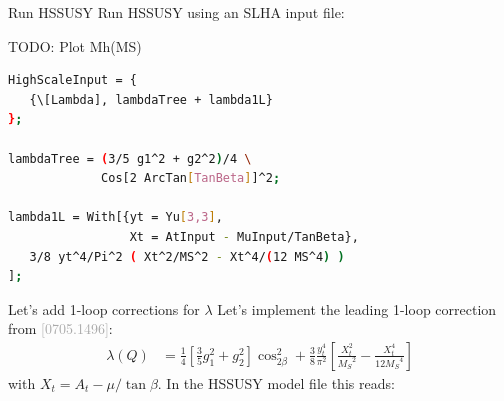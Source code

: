 \documentclass[hyperref={pdfpagelabels=false},ngerman]{beamer}
\newcommand{\MS}{\ensuremath{M_S}}
\newcommand{\bigcite}[1]{\textcolor{darkgray}{[#1]}}
\begin{document}
\begin{frame}{Run HSSUSY}
  Run HSSUSY using an SLHA input file:\\[2em]
  \usebox{\listbox}
\end{frame}

\begin{frame}
  TODO: Plot Mh(MS)
\end{frame}

\begin{lrbox}{\listbox}\begin{lstlisting}[language=bash]
HighScaleInput = {
   {\[Lambda], lambdaTree + lambda1L}
};

lambdaTree = (3/5 g1^2 + g2^2)/4 \
             Cos[2 ArcTan[TanBeta]]^2;

lambda1L = With[{yt = Yu[3,3],
                 Xt = AtInput - MuInput/TanBeta},
   3/8 yt^4/Pi^2 ( Xt^2/MS^2 - Xt^4/(12 MS^4) )
];
\end{lstlisting}\end{lrbox} %

\begin{frame}{Let's add 1-loop corrections for $\lambda$}
  Let's implement the leading 1-loop correction from
  \bigcite{0705.1496}:
  \begin{align*}
    \lambda(Q) &= \frac{1}{4} \left[ \frac{3}{5} g_1^2 + g_2^2 \right] \cos_{2\beta}^2 
    + \frac{3}{8} \frac{y_t^4}{\pi^2}\left[
       \frac{X_t^2}{\MS^2}
       - \frac{X_t^4}{12 \MS^4}
    \right]
  \end{align*}
  with $X_t = A_t - \mu/\tan\beta$.
  In the HSSUSY model file this reads:\\[2em]
  \usebox{\listbox}
\end{frame}
\end{document}
